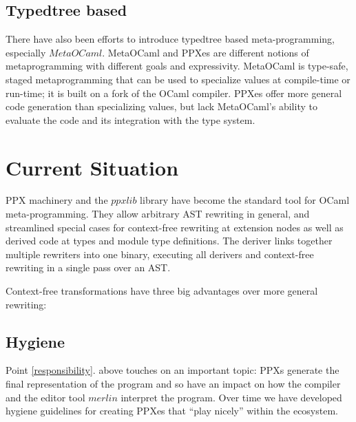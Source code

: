 \documentclass[10pt, a4paper, twocolumn]{article}
\begin{document}
\subsection{Typedtree based}

There have also been efforts to introduce typedtree based meta-programming,
especially $MetaOCaml$. MetaOCaml and PPXes are different notions of
metaprogramming with different goals and expressivity. MetaOCaml is type-safe,
staged metaprogramming that can be used to specialize values at compile-time or
run-time; it is built on a fork of the OCaml compiler. PPXes offer more general
code generation than specializing values, but lack MetaOCaml's ability to
evaluate the code and its integration with the type system.

\section{Current Situation}

PPX machinery and the $ppxlib$ library have become the standard tool for OCaml
meta-programming. They allow arbitrary AST rewriting in general, and streamlined
special cases for context-free rewriting at extension nodes as well as derived
code at types and module type definitions. The deriver links together multiple
rewriters into one binary, executing all derivers and context-free rewriting in
a single pass over an AST.

Context-free transformations have three big advantages over more general rewriting:

\subsection{Hygiene}

Point \ref{responsibility}. above touches on an important topic: PPXs generate
the final representation of the program and so have an impact on how the
compiler and the editor tool $merlin$ interpret the program. Over time we have
developed hygiene guidelines for creating PPXes that ``play nicely'' within the
ecosystem.
\end{document}
